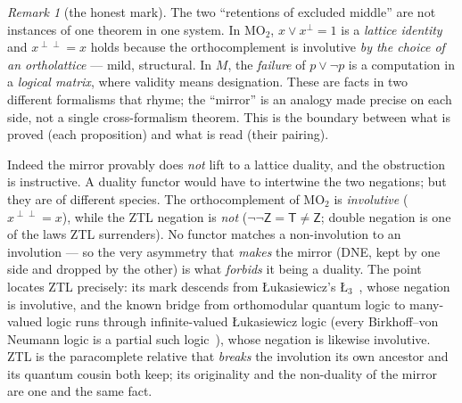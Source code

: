 \documentclass[11pt]{article}
\theoremstyle{remark}
\newtheorem*{rem}{Remark}
\newcommand{\T}{\mathsf{T}}
\newcommand{\Zmark}{\mathsf{Z}}
\begin{document}
\begin{rem}[the honest mark]
The two ``retentions of excluded middle'' are not instances of one theorem in
one system. In $\mathrm{MO}_2$, $x \vee x^{\perp} = 1$ is a \emph{lattice
identity} and $x^{\perp\perp}=x$ holds because the orthocomplement is
involutive \emph{by the choice of an ortholattice} --- mild, structural. In
$M$, the \emph{failure} of $p \vee \neg p$ is a computation in a \emph{logical
matrix}, where validity means designation. These are facts in two different
formalisms that rhyme; the ``mirror'' is an analogy made precise on each side,
not a single cross-formalism theorem. This is the boundary between what is
proved (each proposition) and what is read (their pairing).

Indeed the mirror provably does \emph{not} lift to a lattice duality, and the
obstruction is instructive. A duality functor would have to intertwine the two
negations; but they are of different species. The orthocomplement of
$\mathrm{MO}_2$ is \emph{involutive} ($x^{\perp\perp}=x$), while the ZTL
negation is \emph{not} ($\neg\neg\Zmark = \T \neq \Zmark$; double negation is
one of the laws ZTL surrenders). No functor matches a non-involution to an
involution --- so the very asymmetry that \emph{makes} the mirror (DNE, kept by
one side and dropped by the other) is what \emph{forbids} it being a duality.
The point locates ZTL precisely: its mark descends from {\L}ukasiewicz's
$\text{{\L}}_3$~\cite{lukasiewicz}, whose negation is involutive, and the known
bridge from orthomodular quantum logic to many-valued logic runs through
infinite-valued {\L}ukasiewicz logic (every Birkhoff--von Neumann logic is a
partial such logic~\cite{pykacz}), whose negation is likewise involutive. ZTL
is the paracomplete relative that \emph{breaks} the involution its own ancestor
and its quantum cousin both keep; its originality and the non-duality of the
mirror are one and the same fact.
\end{rem}
\end{document}
